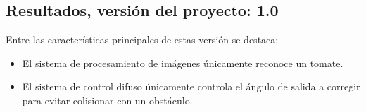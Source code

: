 \subsection{Resultados, versión del proyecto: 1.0}

Entre las características principales de estas versión se destaca:

\begin{itemize}
    \item El sistema de procesamiento de imágenes únicamente reconoce un tomate.
    \item El sistema de control difuso únicamente controla el ángulo de salida a corregir para evitar colisionar con un obstáculo. 
\end{itemize}